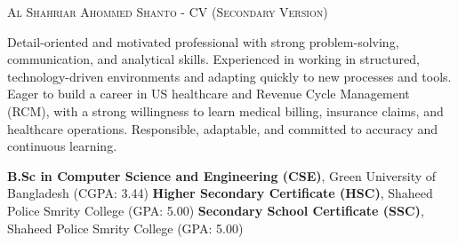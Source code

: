 \documentclass[localFont,alternative,monochrome]{documentMETADATA}
\begin{document}
	\makecvheader

	\makecvfooter
		{\textsc{}} %
		{\textsc{Al Shahriar Ahommed Shanto - CV (Secondary Version)}}
		{\thepage}

	\par{
	Detail-oriented and motivated professional with strong problem-solving, communication, and analytical skills. Experienced in working in structured, technology-driven environments and adapting quickly to new processes and tools. Eager to build a career in US healthcare and Revenue Cycle Management (RCM), with a strong willingness to learn medical billing, insurance claims, and healthcare operations. Responsible, adaptable, and committed to accuracy and continuous learning.
	}
	\vspace{-0.4em}

	\begin{keywords}
	\end{keywords}

	\begin{scholarship}
						{\textbf{B.Sc in Computer Science and Engineering (CSE)}, Green University of Bangladesh (CGPA: 3.44)}
						{\textbf{Higher Secondary Certificate (HSC)}, Shaheed Police Smrity College (GPA: 5.00)}
						{\textbf{Secondary School Certificate (SSC)}, Shaheed Police Smrity College (GPA: 5.00)}
	\end{scholarship}
\end{document}
